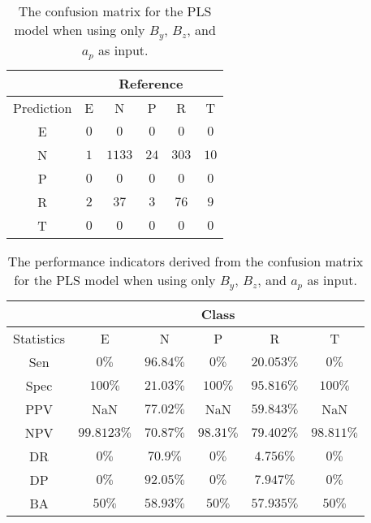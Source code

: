 \begin{table}[!ht]
	\centering
	\begin{tabular}{|c|c|c|c|c|c|}
		\hline
		 & \multicolumn{5}{|c|}{Reference} \\ \hline
		 Prediction & E & N & P & R & T \\ \hline
		 E & $0$ & $0$ & $0$ & $0$ & $0$ \\ \hline
		 N & $1$ & $1133$ & $24$ & $303$ & $10$ \\ \hline
		 P & $0$ & $0$ & $0$ & $0$ & $0$ \\ \hline
		 R & $2$ & $37$ & $3$ & $76$ & $9$ \\ \hline
		 T & $0$ & $0$ & $0$ & $0$ & $0$ \\ \hline
	\end{tabular}
	\caption{The confusion matrix for the PLS model when using only $B_{y}$, $B_{z}$, and $a_{p}$ as input.}
	\label{tab:cm:yzap:pls}
\end{table}

\begin{table}[!ht]
	\centering
	\begin{tabular}{|c|c|c|c|c|c|}
		\hline
		 & \multicolumn{5}{c|}{Class} \\ \hline
		Statistics & E & N & P & R & T \\ \hline
		Sen & $0\%$ & $96.84\%$ & $0\%$ & $20.053\%$ & $0\%$ \\ \hline
		Spec & $100\%$ & $21.03\%$ & $100\%$ & $95.816\%$ & $100\%$ \\ \hline
		PPV & NaN & $77.02\%$ & NaN & $59.843\%$ & NaN \\ \hline
		NPV & $99.8123\%$ & $70.87\%$ & $98.31\%$ & $79.402\%$ & $98.811\%$ \\ \hline
		DR & $0\%$ & $70.9\%$ & $0\%$ & $4.756\%$ & $0\%$ \\ \hline
		DP & $0\%$ & $92.05\%$ & $0\%$ & $7.947\%$ & $0\%$ \\ \hline
		BA & $50\%$ & $58.93\%$ & $50\%$ & $57.935\%$ & $50\%$ \\ \hline
	\end{tabular}
	\caption{The performance indicators derived from the confusion matrix for the PLS model when using only $B_{y}$, $B_{z}$, and $a_{p}$ as input.}
	\label{tab:cs:reverse:yzap:pls}
\end{table}
